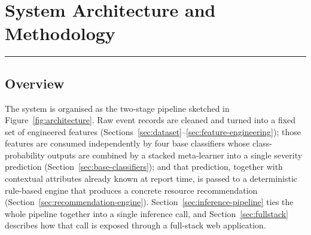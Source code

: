 \chapter{System Architecture and Methodology}
\label{chap:architecture}
\noindent \rule{6.6in}{0.01in}
\newpage

\section{Overview}

The system is organised as the two-stage pipeline sketched in Figure~\ref{fig:architecture}. Raw event records are cleaned and turned into a fixed set of engineered features (Sections~\ref{sec:dataset}--\ref{sec:feature-engineering}); those features are consumed independently by four base classifiers whose class-probability outputs are combined by a stacked meta-learner into a single severity prediction (Section~\ref{sec:base-classifiers}); and that prediction, together with contextual attributes already known at report time, is passed to a deterministic rule-based engine that produces a concrete resource recommendation (Section~\ref{sec:recommendation-engine}). Section~\ref{sec:inference-pipeline} ties the whole pipeline together into a single inference call, and Section~\ref{sec:fullstack} describes how that call is exposed through a full-stack web application.

